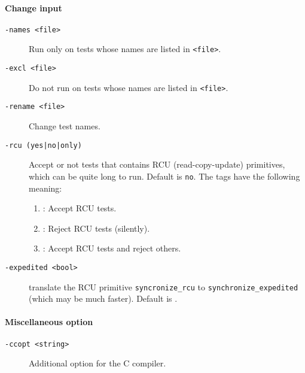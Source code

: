 \paragraph*{Change input}
\begin{description}
\item[{\tt -names <file>}] Run \litmus{} only on tests whose names are
listed in \texttt{<file>}.
\item[{\tt -excl <file>}] Do not run \litmus{} on tests whose names are
listed in \texttt{<file>}.
\item[{\tt -rename <file>}] Change test names.
\item[{\tt -rcu (yes|no|only)}]
Accept or not tests that contains RCU (read-copy-update) primitives,
which can be quite long to run. Default is \texttt{no}.
The tags have the following meaning:
\begin{enumerate}
\item {}: Accept RCU tests.
\item {}: Reject  RCU tests (silently).
\item {}: Accept RCU tests and reject others.
\end{enumerate}
\item[\tt -expedited <bool>]  translate the RCU primitive
\verb+syncronize_rcu+ to
\verb+synchronize_expedited+ (which may be much faster).
Default is .
\end{description}

\paragraph*{Miscellaneous option}
\begin{description}
\item[{\tt -ccopt <string>}]Additional option for the C compiler.
\end{description}
